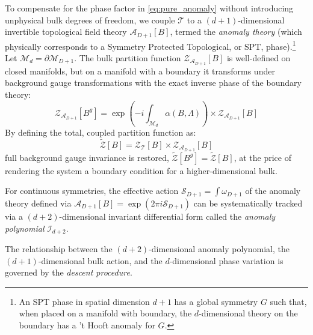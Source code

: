 \documentclass[aps,preprint,nofootinbib,preprintnumbers,eqsecnum,superscriptaddress]{revtex4}
\numberwithin{equation}{section}
\begin{document}
To compensate for the phase factor in \ref{eq:pure_anomaly} without introducing unphysical bulk degrees of freedom, we couple $\mathcal{T}$ to a $(d+1)$-dimensional invertible topological field theory $\mathcal{A}_{D+1}[B]$, termed the \textit{anomaly theory} (which physically corresponds to a Symmetry Protected Topological, or SPT, phase).\footnote{An SPT phase in spatial dimension $d+1$ has a global symmetry $G$ such that, when placed on a manifold with boundary, the $d$-dimensional theory on the boundary has a ’t Hooft anomaly for $G$.} Let $\mathcal{M}_d = \partial \mathcal{M}_{D+1}$. The bulk partition function $\mathcal{Z}_{\mathcal{A}_{D+1}}[B]$ is well-defined on closed manifolds, but on a manifold with a boundary it transforms under background gauge transformations with the exact inverse phase of the boundary theory:
\begin{equation}
    \mathcal{Z}_{\mathcal{A}_{D+1}}[B^g] = \exp\left(-i \int_{\mathcal{M}_d} \alpha(B, \Lambda)\right) \times \mathcal{Z}_{\mathcal{A}_{D+1}}[B]
\end{equation}
By defining the total, coupled partition function as:
\begin{equation}
    \widetilde{\mathcal{Z}}[B] = \mathcal{Z}_{\mathcal{T}}[B] \times \mathcal{Z}_{\mathcal{A}_{D+1}}[B]
\end{equation}
full background gauge invariance is restored, $\widetilde{\mathcal{Z}}[B^g] = \widetilde{\mathcal{Z}}[B]$, at the price of rendering the system a boundary condition for a higher-dimensional bulk.

For continuous symmetries, the effective action $\mathcal{S}_{D+1} = \int \omega_{D+1}$ of the anomaly theory defined via $\mathcal{A}_{D+1}[B] = \exp(2\pi i \mathcal{S}_{D+1})$ can be systematically tracked via a $(d+2)$-dimensional invariant differential form called the \textit{anomaly polynomial} $\mathcal{I}_{d+2}$.

The relationship between the $(d+2)$-dimensional anomaly polynomial, the $(d+1)$-dimensional bulk action, and the $d$-dimensional phase variation is governed by the \textit{descent procedure}. 
\end{document}

